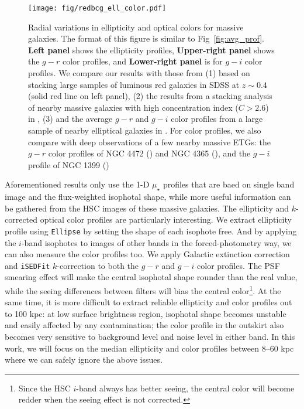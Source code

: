 \documentclass[a4paper,fleqn,usenatbib]{mnras}
\def\mden{{$\mu_{\star}$}}
\begin{document}
  \begin{figure}
      \centering 
      \texttt{[image: fig/redbcg\_ell\_color.pdf]}
      \caption{
          Radial variations in ellipticity and optical colors for massive galaxies. 
          The format of this figure is similar to Fig~\ref{fig:avg_prof}. 
          \textbf{Left panel} shows the ellipticity profiles, 
          \textbf{Upper-right panel} shows the $g-r$ color profiles, and 
          \textbf{Lower-right panel} is for $g-i$ color profiles. 
          We compare our results with those from (1) \citet{Tal2011} based on stacking 
          large samples of luminous red galaxies in SDSS at $z{\sim} 0.4$ 
          (solid red line on left panel), 
          (2) the results from a stacking analysis of nearby massive 
          galaxies with high concentration index ($C>2.6$) in 
          \citet[][blue dash lines on the left and upper-right panels]{DSouza2014}, 
          (3) and the average $g-r$ and $g-i$ color profiles 
          from a large sample of nearby elliptical galaxies in \citet[][blue, solid 
          lines on both right panels]{LaBarbera2010}.
          For color profiles, we also compare with deep observations of a few nearby 
          massive ETGs: the $g-r$ color profiles of NGC 4472 (\citealt{Mihos2013}) 
          and NGC 4365 (\citealt{Mihos2017}), and the $g-i$ profile of NGC 1399 
          (\citealt{Iodice2016})
          }
      \label{fig:ell_color}
  \end{figure}
    
	Aforementioned results only use the 1-D \mden{} profiles that are baed on single 
	band image and the flux-weighted isophotal shape, while more useful information 
	can be gathered from the HSC images of these massive galaxies.
	The ellipticity and $k$-corrected optical color profiles are particularly 
	interesting.
	We extract ellipticity profile using \texttt{Ellipse} by setting the shape of each 
	isophote free. 
	And by applying the $i$-band isophotes to images of other bands in the 
	forced-photometry way, we can also measure the color profiles too. 
	We apply Galactic extinction correction and \texttt{iSEDFit} $k$-correction to 
	both the $g-r$ and $g-i$ color profiles.
	The PSF smearing effect will make the central isophotal shape rounder than the 
	real value, while the seeing differences between filters will bias the central 
	color\footnote{Since the HSC $i$-band always has better seeing, the central color 
	will become redder when the seeing effect is not corrected.}. 
	At the same time, it is more difficult to extract reliable ellipticity and 
	color profiles out to 100 kpc: at low surface brightness region, isophotal shape 
	becomes unstable and easily affected by any contamination; the color profile in
	the outskirt also becomes very sensitive to background level and noise level in 
	either band. 
	In this work, we will focus on the median ellipticity and color profiles between 
	8--60 kpc where we can safely ignore the above issues. 
	
\end{document}
